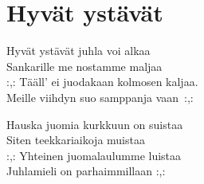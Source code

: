 \section{Hyvät ystävät}
Hyvät ystävät juhla voi alkaa\\
Sankarille me nostamme maljaa\\
:,: Tääll’ ei juodakaan kolmosen kaljaa.\\
Meille viihdyn suo samppanja vaan~:,:

Hauska juomia kurkkuun on suistaa\\
Siten teekkariaikoja muistaa\\
:,: Yhteinen juomalaulumme luistaa \\
Juhlamieli on parhaimmillaan :,: